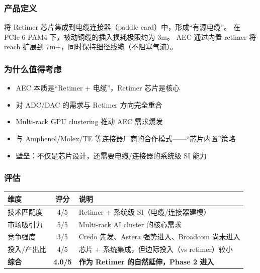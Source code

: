 \documentclass[11pt,a4paper]{ctexart}
\begin{document}
\subsubsection{产品定义}
将 Retimer 芯片集成到电缆连接器（paddle card）中，形成``有源电缆''。
在 PCIe 6 PAM4 下，被动铜缆的插入损耗极限约为 3m。
AEC 通过内置 retimer 将 reach 扩展到 7m+，同时保持细径线缆（不阻塞气流）。

\subsubsection{为什么值得考虑}

\begin{itemize}
    \item AEC 本质是``Retimer + 电缆''，Retimer 芯片是核心
    \item 对 ADC/DAC 的需求与 Retimer 方向完全重合
    \item Multi-rack GPU clustering 推动 AEC 需求爆发
    \item 与 Amphenol/Molex/TE 等连接器厂商的合作模式——``芯片内置''策略
    \item 壁垒：不仅是芯片设计，还需要电缆/连接器的系统级 SI 能力
\end{itemize}

\subsubsection{评估}

\begin{table}[htb]
    \centering
    \begin{tabular}{l c p{}}
        \toprule
        \textbf{维度} & \textbf{评分} & \textbf{说明} \\
        \midrule
        技术匹配度 & 4/5 & Retimer + 系统级 SI（电缆/连接器建模）\\
        市场吸引力 & 5/5 & Multi-rack AI cluster 的核心需求 \\
        竞争强度 & 3/5 & Credo 先发、Astera 强势进入、Broadcom 尚未进入 \\
        投入/产出比 & 4/5 & 芯片 + 系统集成，但边际投入（vs retimer）较小 \\
        \midrule
        \rowcolor{strong}
        \textbf{综合} & \textbf{4.0/5} & \textbf{作为 Retimer 的自然延伸，Phase 2 进入} \\
        \bottomrule
    \end{tabular}
\end{table}
\end{document}
